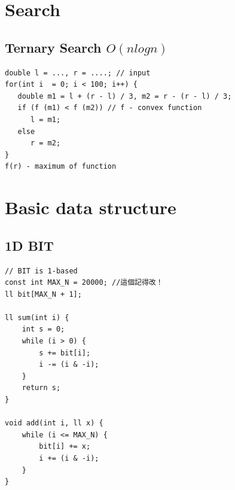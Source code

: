 \documentclass[10pt,oneside]{article}
\begin{document}
\begin{landscape}
\begin{multicols}{2}



\section{Search}

\subsection{Ternary Search $O(nlogn)$}

\begin{verbatim}
double l = ..., r = ....; // input
for(int i  = 0; i < 100; i++) {
   double m1 = l + (r - l) / 3, m2 = r - (r - l) / 3;
   if (f (m1) < f (m2)) // f - convex function
      l = m1;
   else
      r = m2;
}
f(r) - maximum of function
\end{verbatim}




\section{Basic data structure}

\subsection{1D BIT}

\begin{verbatim}
// BIT is 1-based
const int MAX_N = 20000; //這個記得改！
ll bit[MAX_N + 1];

ll sum(int i) {
    int s = 0;
    while (i > 0) {
        s += bit[i];
        i -= (i & -i);
    }
    return s;
}

void add(int i, ll x) {
    while (i <= MAX_N) {
        bit[i] += x;
        i += (i & -i);
    }
}
\end{verbatim}


\end{multicols}
\end{landscape}
\end{document}
